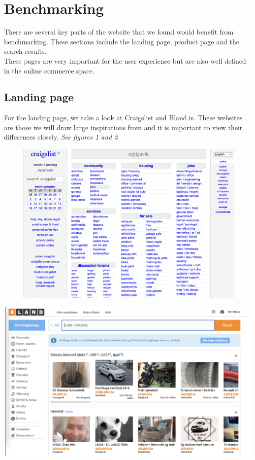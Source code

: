 \section{Benchmarking}
There are several key parts of the website that we found would benefit from benchmarking. These sections include the landing page, product page and the search results.\\

These pages are very important for the user experience but are also well defined in the online commerce space. 
\subsection{Landing page}
For the landing page, we take a look at Craigslist and Bland.is.
These websites are those we will draw large inspirations from and it is important to view their differences closely. \textit{See figures 1 and 2}

\begin{Figure}
    \begin{center}
        \includegraphics[width=150mm, height=80mm]{Images/benchmarking/landing_page_cl.png}
    \end{center}
\end{Figure}
\begin{Figure}
    \begin{center}
        \includegraphics[width=150mm, height=80mm]{Images/benchmarking/landing_page_bland.png}
    \end{center}
\end{Figure}


